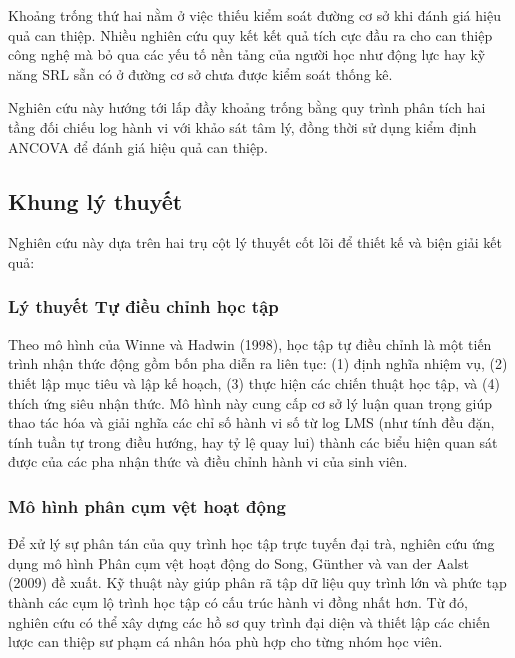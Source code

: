 Khoảng trống thứ hai nằm ở việc thiếu kiểm soát đường cơ sở khi đánh giá hiệu quả can thiệp. Nhiều nghiên cứu quy kết kết quả tích cực đầu ra cho can thiệp công nghệ mà bỏ qua các yếu tố nền tảng của người học như động lực hay kỹ năng SRL sẵn có ở đường cơ sở chưa được kiểm soát thống kê.

Nghiên cứu này hướng tới lấp đầy khoảng trống bằng quy trình phân tích hai tầng đối chiếu log hành vi với khảo sát tâm lý, đồng thời sử dụng kiểm định ANCOVA để đánh giá hiệu quả can thiệp.

\subsection{Khung lý thuyết}

Nghiên cứu này dựa trên hai trụ cột lý thuyết cốt lõi để thiết kế và biện giải kết quả:

\subsubsection{Lý thuyết Tự điều chỉnh học tập}
Theo mô hình của Winne và Hadwin (1998), học tập tự điều chỉnh là một tiến trình nhận thức động gồm bốn pha diễn ra liên tục: (1) định nghĩa nhiệm vụ, (2) thiết lập mục tiêu và lập kế hoạch, (3) thực hiện các chiến thuật học tập, và (4) thích ứng siêu nhận thức. Mô hình này cung cấp cơ sở lý luận quan trọng giúp thao tác hóa và giải nghĩa các chỉ số hành vi số từ log LMS (như tính đều đặn, tính tuần tự trong điều hướng, hay tỷ lệ quay lui) thành các biểu hiện quan sát được của các pha nhận thức và điều chỉnh hành vi của sinh viên.

\subsubsection{Mô hình phân cụm vệt hoạt động}
Để xử lý sự phân tán của quy trình học tập trực tuyến đại trà, nghiên cứu ứng dụng mô hình Phân cụm vệt hoạt động do Song, Günther và van der Aalst (2009) đề xuất. Kỹ thuật này giúp phân rã tập dữ liệu quy trình lớn và phức tạp thành các cụm lộ trình học tập có cấu trúc hành vi đồng nhất hơn. Từ đó, nghiên cứu có thể xây dựng các hồ sơ quy trình đại diện và thiết lập các chiến lược can thiệp sư phạm cá nhân hóa phù hợp cho từng nhóm học viên.
